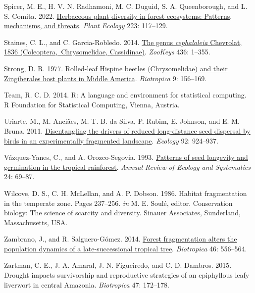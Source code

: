 \documentclass[
  12pt,
  man, donotrepeattitle]{apa6}
\newlength{\cslhangindent}
\newlength{\cslentryspacingunit} %
\newenvironment{CSLReferences}[2] %
 {%
  \setlength{\parindent}{0pt}
  \ifodd #1
  \let\oldpar\par
  \def\par{\hangindent=\cslhangindent\oldpar}
  \fi
  \setlength{\parskip}{#2\cslentryspacingunit}
 }%
 {}
\begin{document}
\begin{CSLReferences}{1}{0}
\leavevmode{}%
Spicer, M. E., H. V. N. Radhamoni, M. C. Duguid, S. A. Queenborough, and L. S. Comita. 2022. \href{https://doi.org/10.1007/s11258-021-01202-9}{Herbaceous plant diversity in forest ecosystems: Patterns, mechanisms, and threats}. \emph{Plant Ecology} 223: 117--129.

\leavevmode{}%
Staines, C. L., and C. Garcia-Robledo. 2014. \href{https://doi.org/10.3897/zookeys.436.5766}{The genus \emph{cephaloleia} {Chevrolat}, 1836 ({Coleoptera},~{Chrysomelidae}, {Cassidinae})}. \emph{ZooKeys} 436: 1--355.

\leavevmode{}%
Strong, D. R. 1977. \href{https://doi.org/10.2307/2387878}{Rolled-leaf {Hispine} beetles ({Chrysomelidae}) and their {Zingiberales} host plants in {Middle} {America}}. \emph{Biotropica} 9: 156--169.

\leavevmode{}%
Team, R. C. D. 2014. R: {A} language and environment for statistical computing. R Foundation for Statistical Computing, Vienna, Austria.

\leavevmode{}%
Uriarte, M., M. Anciães, M. T. B. da Silva, P. Rubim, E. Johnson, and E. M. Bruna. 2011. \href{https://doi.org/10.1890/10-0709.1}{Disentangling the drivers of reduced long-distance seed dispersal by birds in an experimentally fragmented landscape}. \emph{Ecology} 92: 924--937.

\leavevmode{}%
Vázquez-Yanes, C., and A. Orozco-Segovia. 1993. \href{https://doi.org/10.1146/annurev.es.24.110193.000441}{Patterns of seed longevity and germination in the tropical rainforest}. \emph{Annual Review of Ecology and Systematics} 24: 69--87.

\leavevmode{}%
Wilcove, D. S., C. H. McLellan, and A. P. Dobson. 1986. Habitat fragmentation in the temperate zone. Pages 237--256. \emph{in} M. E. Soulé, editor. Conservation biology: {The} science of scarcity and diversity. Sinauer Associates, Sunderland, Massachusetts, USA.

\leavevmode{}%
Zambrano, J., and R. Salguero-Gómez. 2014. \href{https://doi.org/10.1111/btp.12144}{Forest fragmentation alters the population dynamics of a late-successional tropical tree}. \emph{Biotropica} 46: 556--564.

\leavevmode{}%
Zartman, C. E., J. A. Amaral, J. N. Figueiredo, and C. D. Dambros. 2015. Drought impacts survivorship and reproductive strategies of an epiphyllous leafy liverwort in central {Amazonia}. \emph{Biotropica} 47: 172--178.

\end{CSLReferences}
\end{document}
